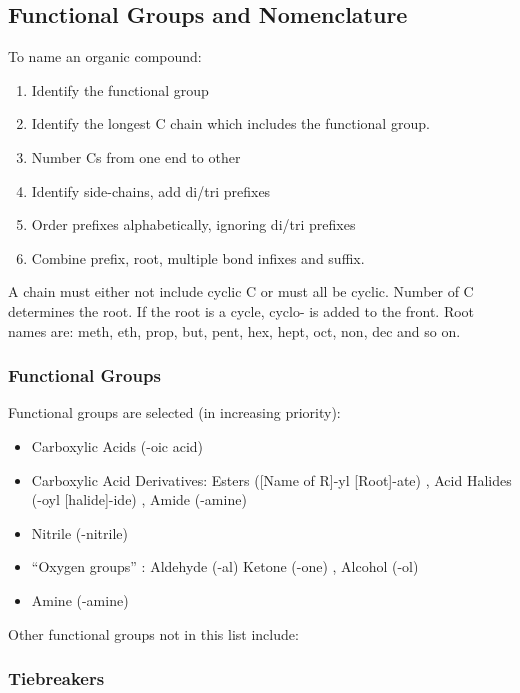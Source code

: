 \documentclass[../main]{subfiles}
\begin{document}
	\subsection{Functional Groups and Nomenclature}

	To name an organic compound:

	\begin{enumerate}
		\item Identify the functional group 
		\item Identify the longest C chain which includes the functional group.
		\item Number Cs from one end to other
		\item Identify side-chains, add di/tri prefixes
		\item Order prefixes alphabetically, ignoring di/tri prefixes
		\item Combine prefix, root, multiple bond infixes and suffix.
	\end{enumerate}

	A chain must either not include cyclic C or must all be cyclic. Number of C determines the root. If the root is a cycle, cyclo- is added to the front. Root names are: meth, eth, prop, but, pent, hex, hept, oct, non, dec and so on. \\

	\subsubsection{Functional Groups}

	Functional groups are selected (in increasing priority):
	\begin{itemize}
		\item Carboxylic Acids (-oic acid) 
		\item Carboxylic Acid Derivatives: Esters ([Name of R]-yl [Root]-ate) , Acid Halides (-oyl [halide]-ide) , Amide (-amine) 
		\item Nitrile (-nitrile) 
		\item ``Oxygen groups'' : Aldehyde (-al)  Ketone (-one)  , Alcohol (-ol) 
		\item Amine (-amine) 
	\end{itemize}

	Other functional groups not in this list include:

	\subsubsection{Tiebreakers}
\end{document}
